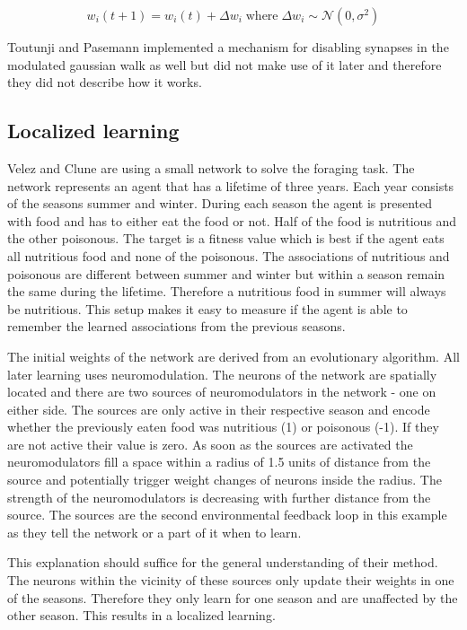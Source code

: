 \documentclass[12pt,twoside]{scrartcl}
\theoremstyle{plain}
\theoremstyle{definition}
\theoremstyle{remark}
\begin{document}
\[
    w_i (t + 1) = w_i (t) + \Delta w_i \;\text{where}\; \Delta w_i \sim \mathcal{N}(0, \sigma^2)
\]

Toutunji and Pasemann implemented a mechanism for disabling synapses
in the modulated gaussian walk as well but did not make use of it later and
therefore they did not describe how it works.

\subsection{Localized learning}
\label{subsec:diffusion}

Velez and Clune are using a small network to solve the foraging task. The network
represents an agent that has a lifetime of three years. Each year consists of
the seasons summer and winter. During each season the agent is presented with
food and has to either eat the food or not. Half of the food is nutritious
and the other poisonous. The target is a fitness value which is best if the
agent eats all nutritious food and none of the poisonous. The associations of
nutritious and poisonous are different between summer and winter but within
a season remain the same during the lifetime. Therefore a nutritious food in
summer will always be nutritious.
This setup makes it easy to measure if the agent is able to remember the learned
associations from the previous seasons.

The initial weights of the network are derived from an evolutionary algorithm.
All later learning uses neuromodulation. The neurons of the network are spatially
located and there are two sources of neuromodulators in the network - one on either
side. The sources are only active in their respective season and encode whether
the previously eaten food was nutritious (1) or poisonous (-1). If they are
not active their value is zero. As soon as the sources are activated the neuromodulators
fill a space within a radius of 1.5 units of distance from the source and potentially
trigger weight changes of neurons inside the radius. The strength of the neuromodulators
is decreasing with further distance from the source. The sources are the second
environmental feedback loop in this example as they tell the network or a part of
it when to learn.

This explanation should suffice for the general understanding of their method.
The neurons within the vicinity of these sources only update their weights
in one of the seasons. Therefore they only learn for one season and are unaffected
by the other season. This results in a localized learning.
\end{document}
